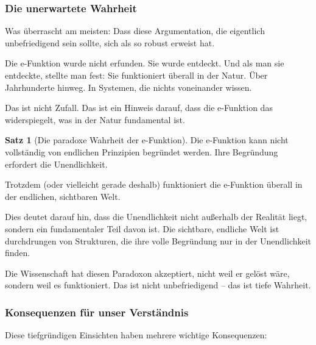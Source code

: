 \documentclass[a4paper,12pt,twoside]{report}
\theoremstyle{definition}
\newtheorem{satz}{Satz}
\begin{document}
\subsubsection*{Die unerwartete Wahrheit}

Was überrascht am meisten: Dass diese Argumentation, die eigentlich unbefriedigend sein sollte, sich als so robust erweist hat. 

Die e-Funktion wurde nicht erfunden. Sie wurde entdeckt. Und als man sie entdeckte, stellte man fest: Sie funktioniert überall in der Natur. Über Jahrhunderte hinweg. In Systemen, die nichts voneinander wissen. 

Das ist nicht Zufall. Das ist ein Hinweis darauf, dass die e-Funktion das widerspiegelt, was in der Natur fundamental ist.

\begin{satz}[Die paradoxe Wahrheit der e-Funktion]
	Die e-Funktion kann nicht vollständig von endlichen Prinzipien begründet werden. Ihre Begründung erfordert die Unendlichkeit.
	
	Trotzdem (oder vielleicht gerade deshalb) funktioniert die e-Funktion überall in der endlichen, sichtbaren Welt.
	
	Dies deutet darauf hin, dass die Unendlichkeit nicht außerhalb der Realität liegt, sondern ein fundamentaler Teil davon ist. Die sichtbare, endliche Welt ist durchdrungen von Strukturen, die ihre volle Begründung nur in der Unendlichkeit finden.
	
	Die Wissenschaft hat diesen Paradoxon akzeptiert, nicht weil er gelöst wäre, sondern weil es funktioniert. Das ist nicht unbefriedigend -- das ist tiefe Wahrheit.
\end{satz}

\subsubsection*{Konsequenzen für unser Verständnis}

Diese tiefgründigen Einsichten haben mehrere wichtige Konsequenzen:
\end{document}
